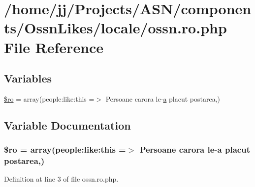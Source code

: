 \hypertarget{components_2_ossn_likes_2locale_2ossn_8ro_8php}{}\section{/home/jj/\+Projects/\+A\+S\+N/components/\+Ossn\+Likes/locale/ossn.ro.\+php File Reference}
\label{components_2_ossn_likes_2locale_2ossn_8ro_8php}
\subsection*{Variables}
\begin{DoxyCompactItemize}
\item 
\hyperlink{components_2_ossn_likes_2locale_2ossn_8ro_8php_ad432e1965f7fa8ce0807b244734e70f8}{\$ro} = array(\textquotesingle{}people\+:like\+:this\textquotesingle{} =$>$ \textquotesingle{}Persoane carora le-\/\hyperlink{_chart_8min_8js_aef3b685c08bc6c76c8e729bd0e93901d}{a} placut postarea\textquotesingle{},)
\end{DoxyCompactItemize}


\subsection{Variable Documentation}
\subsubsection[{\texorpdfstring{\$ro}{$ro}}]{\setlength{\rightskip}{0pt plus 5cm}\$ro = array(\textquotesingle{}people\+:like\+:this\textquotesingle{} =$>$ \textquotesingle{}Persoane carora le-\/{\bf a} placut postarea\textquotesingle{},)}\hypertarget{components_2_ossn_likes_2locale_2ossn_8ro_8php_ad432e1965f7fa8ce0807b244734e70f8}{}\label{components_2_ossn_likes_2locale_2ossn_8ro_8php_ad432e1965f7fa8ce0807b244734e70f8}


Definition at line 3 of file ossn.\+ro.\+php.

